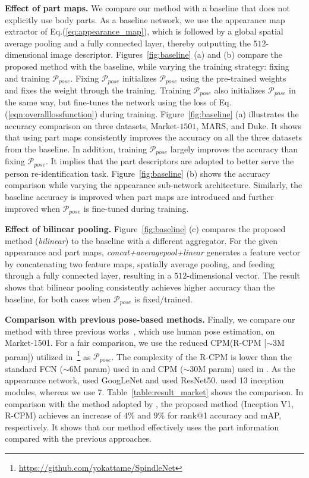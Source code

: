 \documentclass{llncs}
\begin{document}
\noindent\textbf{Effect of part maps.}
We compare our method with a baseline that does not explicitly use body parts.
As a baseline network, we use the appearance map extractor of Eq.(\ref{eq:appearance_map}), which is followed by a global spatial average pooling and a fully connected layer, thereby outputting the $512$-dimensional image descriptor.
Figures~\ref{fig:baseline} (a) and (b) compare the proposed method with the baseline, while varying the training strategy: fixing and training $\mathcal{P}_{pose}$. Fixing $\mathcal{P}_{pose}$ initializes $\mathcal{P}_{pose}$ using the pre-trained weights~\cite{conf/cvpr/cao17,coco} and fixes the weight through the training. Training $\mathcal{P}_{pose}$ also initializes $\mathcal{P}_{pose}$ in the same way, but fine-tunes the network using the loss of Eq.(\ref{eqn:overalllossfunction}) during training.
Figure~\ref{fig:baseline} (a) illustrates the accuracy comparison on three datasets,  Market-$1501$, MARS, and Duke. It shows that using part maps consistently improves the accuracy on all the three datasets from the baseline. In addition, training $\mathcal{P}_{pose}$ largely improves the accuracy than fixing $\mathcal{P}_{pose}$. It implies that the part descriptors are adopted to better serve the person re-identification task. Figure~\ref{fig:baseline} (b) shows the accuracy comparison while varying the {\color{black} appearance sub-network architecture}. Similarly, the baseline accuracy is improved when part maps are introduced and further improved when $\mathcal{P}_{pose}$ is fine-tuned during training.

\noindent\textbf{Effect of bilinear pooling.}
Figure~\ref{fig:baseline} (c) compares the proposed method ({\it bilinear}) to the baseline with a different aggregator. For the given appearance and part maps, {\it concat+averagepool+linear} generates a feature vector by concatenating two feature maps, spatially average pooling, and feeding through a fully connected layer, resulting in a $512$-dimensional vector. The result shows that bilinear pooling consistently achieves higher accuracy than the baseline, for both cases when $\mathcal{P}_{pose}$ is fixed/trained.

\noindent\textbf{Comparison with previous pose-based methods.}
Finally, we compare our method with three previous works~\cite{ZhengHLY17,ZhaoTSSYYWT17,SuLZXGT17}, which use human pose estimation, on Market-1501. For a fair comparison, we use the reduced CPM(R-CPM [$\sim$3M param]) utilized in~\cite{ZhaoTSSYYWT17}\footnote{\url{https://github.com/yokattame/SpindleNet}} as $\mathcal{P}_{pose}$. The complexity of the R-CPM is lower than the standard FCN ($\sim$6M param) used in \cite{SuLZXGT17} and CPM ($\sim$30M param) used in \cite{ZhengHLY17}. As the appearance network, \cite{SuLZXGT17} used GoogLeNet and \cite{ZhengHLY17} used ResNet50. \cite{ZhaoTSSYYWT17} used 13 inception modules, whereas we use 7. Table~\ref{table:result_market} shows the comparison. In comparison with the method adopted by \cite{ZhengHLY17,ZhaoTSSYYWT17,SuLZXGT17}, the proposed method (Inception V1, R-CPM) achieves an increase of $4$\% and $9$\% for rank@1 accuracy and mAP, respectively. It shows that our method effectively uses the part information compared with the previous approaches.
\end{document}
